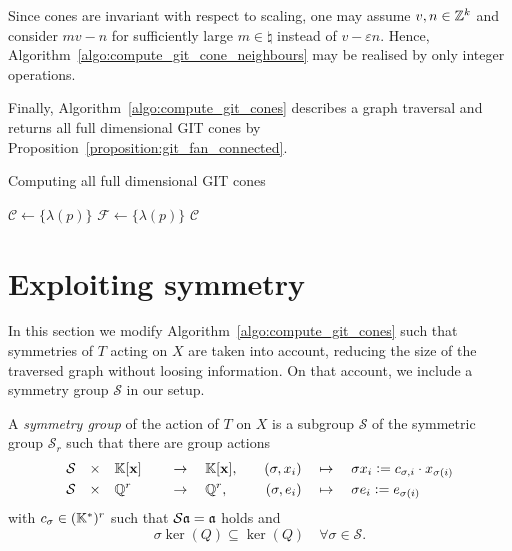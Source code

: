 \begin{remark}
	Since cones are invariant with respect to scaling, one may assume $v,n\in\mathbb{Z}^k$ and consider $mv-n$ for sufficiently large $m\in\natural$ instead of $v-\varepsilon n$. Hence, Algorithm~\ref{algo:compute_git_cone_neighbours} may be realised by only integer operations.
\end{remark}

Finally, Algorithm~\ref{algo:compute_git_cones} describes a graph traversal and returns all full dimensional GIT cones by Proposition~\ref{proposition:git_fan_connected}.

\begin{algorithm}
	\caption{Computing all full dimensional GIT cones}
	\label{algo:compute_git_cones}
	
	\BlankLine
	$\mathcal{C} \leftarrow \{\lambda(p)\}$\;
	$\mathcal{F} \leftarrow \{\lambda(p)\}$\;
	\Return $\mathcal{C}$\;
\end{algorithm}

\section{Exploiting symmetry}

In this section we modify Algorithm~\ref{algo:compute_git_cones} such that symmetries of $T$ acting on $X$ are taken into account, reducing the size of the traversed graph without loosing information. On that account, we include a symmetry group $\mathcal{S}$ in our setup.

\begin{defi}
	\label{definition:symmetry_group}
	A \emph{symmetry group} of the action of $T$ on $X$ is a subgroup $\mathcal{S}$ of the symmetric group $\mathcal{S}_r$ such that there are group actions
	\begin{alignat*}{5}
		\mathcal{S} \quad\times\quad & \mathbb{K}[\mathbf{x}] && \quad\rightarrow\quad \mathbb{K}[\mathbf{x}],\quad & (\sigma, x_i) & \quad\mapsto\quad \sigma x_i \mathrel{\mathop:}= c_{\sigma,i} \cdot x_{\sigma(i)} \\
		\mathcal{S} \quad\times\quad & \mathbb{Q}^r && \quad\rightarrow\quad \mathbb{Q}^r,\quad & (\sigma, e_i) & \quad\mapsto\quad \sigma e_i \mathrel{\mathop:}= e_{\sigma(i)}
	\end{alignat*}
	with $c_\sigma\in(\mathbb{K}^*)^r$ such that $\mathcal{S}\mathfrak{a} = \mathfrak{a}$ holds and
	$$\sigma \ker(Q) \subseteq \ker(Q)\quad\forall\sigma\in \mathcal{S}.$$
\end{defi}


